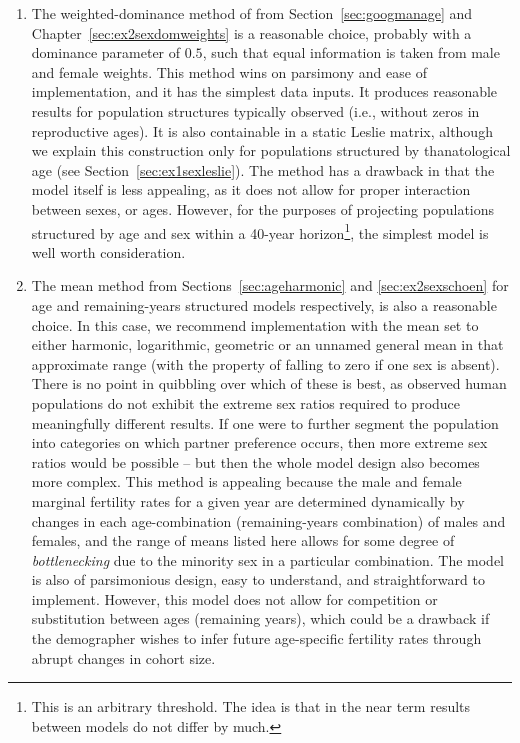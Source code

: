 \begin{enumerate}
\item The weighted-dominance method of \citet{goodman1967age} from
Section~\ref{sec:googmanage} and Chapter~\ref{sec:ex2sexdomweights} is a
reasonable choice, probably with a dominance parameter of $0.5$, 
such that equal information is taken from male and female
weights. This method wins on parsimony and ease of implementation, and it has
the simplest data inputs. It produces reasonable results for population
structures typically observed (i.e., without zeros in reproductive ages). It is
also containable in a static Leslie matrix, although
we  explain this construction only for populations structured by
thanatological age (see Section~\ref{sec:ex1sexleslie}). The method has a
drawback in that the model itself is less appealing, as it does not allow 
for proper interaction between sexes, or ages. However, for the purposes of
projecting populations structured by age and sex within a 40-year
horizon\footnote{This is an arbitrary threshold. The idea is that in the near
term results between models do not differ by much.}, the simplest model is well
worth consideration.

\item The mean method from Sections~\ref{sec:ageharmonic} and
\ref{sec:ex2sexschoen} for age and remaining-years structured models
respectively, is also a reasonable choice. In this case, we recommend
implementation with the mean set to either harmonic, logarithmic, geometric or
an unnamed general mean in that approximate range (with the property of 
falling to zero if one sex is absent). There is no point in
quibbling over which of these is best, as observed human populations do
not exhibit the extreme sex ratios required to produce meaningfully
different results. If one were to further segment the population into
categories on which partner preference occurs, then more extreme sex ratios
would be possible -- but then the whole model design also becomes more complex.
This method is appealing because the male and female marginal fertility rates 
for a given year are determined dynamically by changes in each 
age-combination (remaining-years combination) of males and females, and the
range of means listed here allows for some degree of \textit{bottlenecking} due
to the minority sex in a particular combination. The model is also of
parsimonious design, easy to understand, and straightforward to implement.
However, this model does not allow for competition or substitution between ages
(remaining years), which could be a drawback if the demographer wishes to
infer future age-specific fertility rates through abrupt changes in cohort size.


\end{enumerate}
